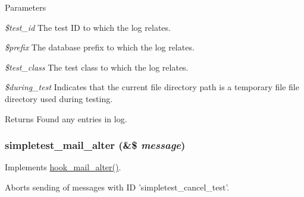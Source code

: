 \begin{DoxyParams}{Parameters}
\item[{\em \$test\_\-id}]The test ID to which the log relates. \item[{\em \$prefix}]The database prefix to which the log relates. \item[{\em \$test\_\-class}]The test class to which the log relates. \item[{\em \$during\_\-test}]Indicates that the current file directory path is a temporary file file directory used during testing. \end{DoxyParams}
\begin{DoxyReturn}{Returns}
Found any entries in log. 
\end{DoxyReturn}
\hypertarget{simpletest_8module_a390f5b49a961ac363a4f469c50cae7c4}{
\subsubsection[{simpletest\_\-mail\_\-alter}]{\setlength{\rightskip}{0pt plus 5cm}simpletest\_\-mail\_\-alter (\&\$ {\em message})}}
\label{simpletest_8module_a390f5b49a961ac363a4f469c50cae7c4}
Implements \hyperlink{group__hooks_gaad1d55a8e7b359933f462a9ca5b2ede0}{hook\_\-mail\_\-alter()}.

Aborts sending of messages with ID 'simpletest\_\-cancel\_\-test'.

